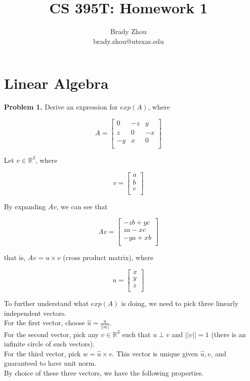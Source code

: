 \documentclass[a4paper]{article}
\title{CS 395T: Homework 1}
\author{Brady Zhou \\ brady.zhou@utexas.edu}
\begin{document}
\maketitle

\section{Linear Algebra}

\textbf{Problem 1.} Derive an expression for $exp(A)$, where

\[
    A = \begin{bmatrix}
            0   & -z    & y \\
            z   & 0     & -x \\
            -y  & x     & 0 \\
        \end{bmatrix}
\]

Let $v \in \mathbb{R}^3$, where

\[
    v = \begin{bmatrix}
            a \\
            b \\
            c \\
        \end{bmatrix}
\]

By expanding $Av$, we can see that

\[
    Av = \begin{bmatrix}
            -zb + yc \\
            za - xc \\
            -ya + xb \\
        \end{bmatrix}
\]

that is, $Av = u \times v$ (cross product matrix), where

\[
    u = \begin{bmatrix}
            x \\
            y \\
            z \\
        \end{bmatrix}
\]

To further understand what $exp(A)$ is doing, we need to pick three linearly independent vectors. \\
For the first vector, choose $\hat u = \frac{u}{||u||}$. \\
For the second vector, pick any $v \in \mathbb{R}^3$ such that $u \perp v$ and $||v|| = 1$ (there is an infinite circle of such vectors). \\
For the third vector, pick $w = \hat u \times v$. This vector is unique given $\hat u, v$, and guaranteed to have unit norm. \\
By choice of these three vectors, we have the following properties.
\end{document}
